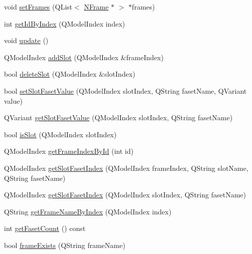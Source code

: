 \begin{DoxyCompactItemize}
\item 
void \hyperlink{class_n_framenet_model_a71cf1dbf6b615efdaabea18cd283f6ee}{setFrames} (QList$<$ \hyperlink{class_n_frame}{NFrame} $\ast$ $>$ $\ast$frames)
\item 
int \hyperlink{class_n_framenet_model_af02b729f62029cb2568964f0e3cb1826}{getIdByIndex} (QModelIndex index)
\item 
void \hyperlink{class_n_framenet_model_a37da98e117aa30527f2bda88ae69c1da}{update} ()
\item 
QModelIndex \hyperlink{class_n_framenet_model_af636b66af1ae90d83be8e5b954079c5d}{addSlot} (QModelIndex \&frameIndex)
\item 
bool \hyperlink{class_n_framenet_model_a00687191343feaeeccde552a5ca2169f}{deleteSlot} (QModelIndex \&slotIndex)
\item 
bool \hyperlink{class_n_framenet_model_aed4621bece5502b1ac553118ec578b1a}{setSlotFasetValue} (QModelIndex slotIndex, QString fasetName, QVariant value)
\item 
QVariant \hyperlink{class_n_framenet_model_ae3b9c587968dc9651aca91d38dd6b382}{getSlotFasetValue} (QModelIndex slotIndex, QString fasetName)
\item 
bool \hyperlink{class_n_framenet_model_a3c2a0189d70c801519e03894644e498e}{isSlot} (QModelIndex slotIndex)
\item 
QModelIndex \hyperlink{class_n_framenet_model_a105c7c8aa68426aab62c52dedda4674e}{getFrameIndexById} (int id)
\item 
QModelIndex \hyperlink{class_n_framenet_model_aedf7aee4d451c0fc7277f0cc39a56277}{getSlotFasetIndex} (QModelIndex frameIndex, QString slotName, QString fasetName)
\item 
QModelIndex \hyperlink{class_n_framenet_model_aa61c4d7f31bed9798224665ae422f3d7}{getSlotFasetIndex} (QModelIndex slotIndex, QString fasetName)
\item 
QString \hyperlink{class_n_framenet_model_ae164cd65113db99625d4f8d94f58d5b8}{getFrameNameByIndex} (QModelIndex index)
\item 
int \hyperlink{class_n_framenet_model_a417346c5073da08e0ec1b5df52767148}{getFasetCount} () const 
\item 
bool \hyperlink{class_n_framenet_model_a17047990c258080d6fbf62803bbb6ea6}{frameExists} (QString frameName)
\end{DoxyCompactItemize}


